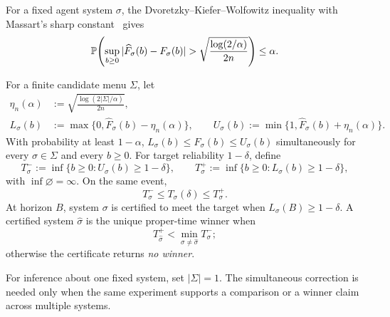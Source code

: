 \begin{theorem}
\label{thm:dkw-system}
For a fixed agent system \(\sigma\), the Dvoretzky--Kiefer--Wolfowitz inequality
with Massart's sharp constant~\citep{massart1990tight} gives
\begin{equation}
\mathbb{P}\!\left(
\sup_{b\ge0}|\widehat F_\sigma(b)-F_\sigma(b)|
>\sqrt{\frac{\log(2/\alpha)}{2n}}
\right)\le\alpha.
\label{eq:dkw-system}
\end{equation}
\end{theorem}

\begin{corollary}
\label{thm:finite-sample}
For a finite candidate menu \(\Sigma\), let
\begin{equation}
\begin{aligned}
\eta_n(\alpha)&:=\sqrt{\frac{\log(2|\Sigma|/\alpha)}{2n}},\\
L_\sigma(b)&:=\max\{0,\widehat F_\sigma(b)-\eta_n(\alpha)\},\qquad
U_\sigma(b):=\min\{1,\widehat F_\sigma(b)+\eta_n(\alpha)\}.
\end{aligned}
\label{eq:simultaneous-radius}
\end{equation}
With probability at least \(1-\alpha\),
\(L_\sigma(b)\le F_\sigma(b)\le U_\sigma(b)\) simultaneously for every
\(\sigma\in\Sigma\) and every \(b\ge0\).  For target reliability
\(1-\delta\), define
\begin{equation}
T_\sigma^-:=\inf\{b\ge0:U_\sigma(b)\ge1-\delta\},
\qquad
T_\sigma^+:=\inf\{b\ge0:L_\sigma(b)\ge1-\delta\},
\label{eq:quantile-band}
\end{equation}
with \(\inf\varnothing=\infty\).  On the same event,
\begin{equation}
T_\sigma^-\le T_\sigma(\delta)\le T_\sigma^+.
\label{eq:proper-time-band}
\end{equation}
At horizon \(B\), system \(\sigma\) is certified to meet the target when
\(L_\sigma(B)\ge1-\delta\).  A certified system \(\widehat\sigma\) is the
unique proper-time winner when
\begin{equation}
T_{\widehat\sigma}^{+}<
\min_{\sigma\ne\widehat\sigma}T_\sigma^{-};
\label{eq:certified-winner}
\end{equation}
otherwise the certificate returns \emph{no winner}.
\end{corollary}

For inference about one fixed system, set \(|\Sigma|=1\).  The simultaneous
correction is needed only when the same experiment supports a comparison or a
winner claim across multiple systems.

